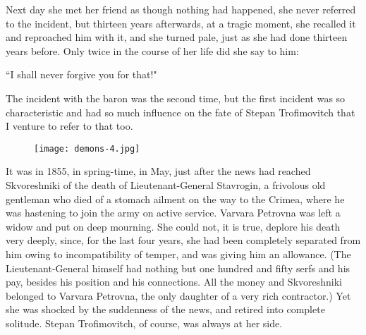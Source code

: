 \documentclass[12pt]{article}
\begin{document}
\vspace{12pt}
Next day she met her friend as though nothing had happened, she never
referred to the incident, but thirteen years afterwards, at a tragic
moment, she recalled it and reproached him with it, and she turned pale,
just as she had done thirteen years before. Only twice in the course of
her life did she say to him:


\vspace{12pt}
``I shall never forgive you for that!"


\vspace{12pt}
The incident with the baron was the second time, but the first incident
was so characteristic and had so much influence on the fate of Stepan
Trofimovitch that I venture to refer to that too.

\begin{figure}[!ht]
\begin{center}
\texttt{[image: demons-4.jpg]}
\end{center}
\end{figure}
\vspace{12pt}
It was in 1855, in spring-time, in May, just after the news had reached
Skvoreshniki of the death of Lieutenant-General Stavrogin, a frivolous
old gentleman who died of a stomach ailment on the way to the Crimea,
where he was hastening to join the army on active service. Varvara
Petrovna was left a widow and put on deep mourning. She could not, it is
true, deplore his death very deeply, since, for the last four years,
she had been completely separated from him owing to incompatibility of
temper, and was giving him an allowance. (The Lieutenant-General himself
had nothing but one hundred and fifty serfs and his pay, besides his
position and his connections. All the money and Skvoreshniki belonged to
Varvara Petrovna, the only daughter of a very rich contractor.) Yet she
was shocked by the suddenness of the news, and retired into complete
solitude. Stepan Trofimovitch, of course, was always at her side.
\end{document}
